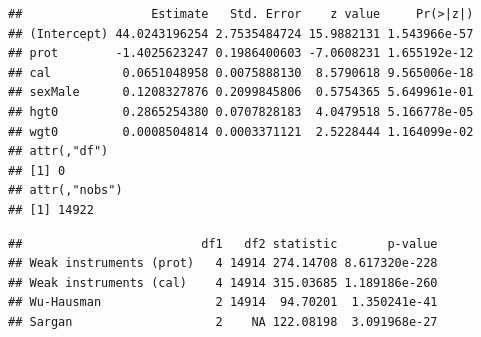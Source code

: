 \documentclass[
]{book}
\newenvironment{Shaded}{\begin{snugshade}}{\end{snugshade}}
\newcommand{\AttributeTok}[1]{\textcolor[rgb]{0.77,0.63,0.00}{#1}}
\newcommand{\CommentTok}[1]{\textcolor[rgb]{0.56,0.35,0.01}{\textit{#1}}}
\newcommand{\ConstantTok}[1]{\textcolor[rgb]{0.00,0.00,0.00}{#1}}
\newcommand{\FunctionTok}[1]{\textcolor[rgb]{0.00,0.00,0.00}{#1}}
\newcommand{\NormalTok}[1]{#1}
\newcommand{\OtherTok}[1]{\textcolor[rgb]{0.56,0.35,0.01}{#1}}
\newcommand{\SpecialCharTok}[1]{\textcolor[rgb]{0.00,0.00,0.00}{#1}}
\begin{document}
\begin{Shaded}
\end{Shaded}

\begin{verbatim}
##                  Estimate   Std. Error    z value     Pr(>|z|)
## (Intercept) 44.0243196254 2.7535484724 15.9882131 1.543966e-57
## prot        -1.4025623247 0.1986400603 -7.0608231 1.655192e-12
## cal          0.0651048958 0.0075888130  8.5790618 9.565006e-18
## sexMale      0.1208327876 0.2099845806  0.5754365 5.649961e-01
## hgt0         0.2865254380 0.0707828183  4.0479518 5.166778e-05
## wgt0         0.0008504814 0.0003371121  2.5228444 1.164099e-02
## attr(,"df")
## [1] 0
## attr(,"nobs")
## [1] 14922
\end{verbatim}

\begin{Shaded}
\end{Shaded}

\begin{verbatim}
##                         df1   df2 statistic       p-value
## Weak instruments (prot)   4 14914 274.14708 8.617320e-228
## Weak instruments (cal)    4 14914 315.03685 1.189186e-260
## Wu-Hausman                2 14914  94.70201  1.350241e-41
## Sargan                    2    NA 122.08198  3.091968e-27
\end{verbatim}
\end{document}
